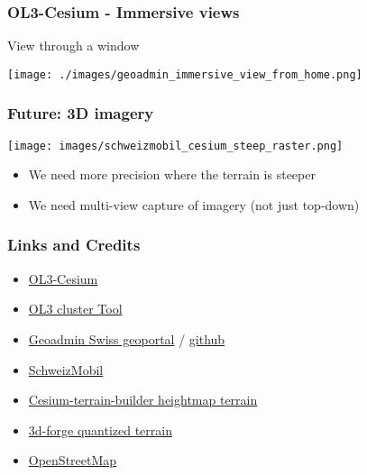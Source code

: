\documentclass[handout]{beamer}
\begin{document}
  \begin{frame}
    \frametitle{OL3-Cesium - Immersive views}
    View through a window
    \begin{center}
      \texttt{[image: ./images/geoadmin\_immersive\_view\_from\_home.png]}
    \end{center}
  \end{frame}

  \begin{frame}
    \frametitle{Future: 3D imagery}
    \begin{center}
      \texttt{[image: images/schweizmobil\_cesium\_steep\_raster.png]}
    \end{center}
    \begin{itemize}
      \pause\item We need more precision where the terrain is steeper
      \pause\item We need multi-view capture of imagery (not just top-down)
    \end{itemize}
  \end{frame}

  \begin{frame}
    \frametitle{Links and Credits}
    \begin{itemize}
      \pause\item \href {https://github.com/openlayers/ol3-cesium}{OL3-Cesium}
      \pause\item \href {https://github.com/gberaudo/ol3-cluster-tool}{OL3 cluster Tool}
      \pause\item \href {https://github.com/geoadmin/mf-geoadmin3}{Geoadmin Swiss geoportal} / \href {https://map.geo.admin.ch}{github}
      \pause\item \href {https://map.schweizmobil.ch}{SchweizMobil}
      \pause\item \href {https://github.com/geo-data/cesium-terrain-builder}{Cesium-terrain-builder heightmap terrain}
      \pause\item \href {https://github.com/geoadmin/3d-forge}{3d-forge quantized terrain}
      \pause\item \href {https://www.openstreetmap.org/about}{OpenStreetMap}
    \end{itemize}
  \end{frame}
\end{document}
